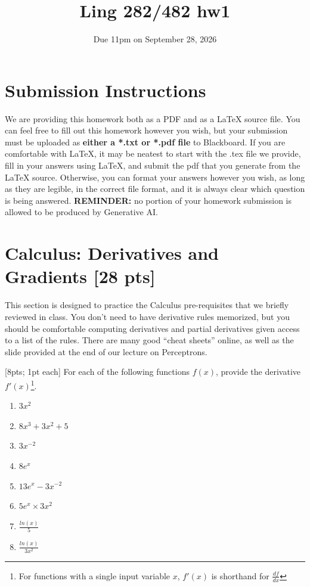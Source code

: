 \documentclass[11pt]{article}
\begin{document}
\title{Ling 282/482 hw1}
\date{\vspace{-0.2in}Due 11pm on September 28, 2026}
\maketitle

\section*{Submission Instructions}
We are providing this homework both as a PDF and as a LaTeX source file. You can feel free to fill out this homework however you wish, but your submission must be uploaded as \textbf{either a *.txt or *.pdf file} to Blackboard. If you are comfortable with LaTeX, it may be neatest to start with the .tex file we provide, fill in your answers using LaTeX, and submit the pdf that you generate from the LaTeX source. Otherwise, you can format your answers however you wish, as long as they are legible, in the correct file format, and it is always clear which question is being answered. \textbf{REMINDER:} no portion of your homework submission is allowed to be produced by Generative AI.

\section{Calculus: Derivatives and Gradients [28 pts]}

This section is designed to practice the Calculus pre-requisites that we briefly reviewed in class. You don't need to have derivative rules memorized, but you should be comfortable computing derivatives and partial derivatives given access to a list of the rules. There are many good ``cheat sheets'' online, as well as the slide provided at the end of our lecture on Perceptrons.

\vspace{2em}
 [8pts; 1pt each] For each of the following functions $f(x)$, provide the derivative $f'(x)$\footnote{For functions with a single input variable $x$, $f'(x)$ is shorthand for $\frac{df}{dx}$}.

\begin{enumerate}[label=\alph*.]
    \setlength\itemsep{1em}
    \item $3x^2$
    \item $8x^3 + 3x^2 + 5$
    \item $3x^{-2}$
    \item $8e^x$
    \item $13e^x - 3x^{-2}$
    \item $5e^x \times 3x^2$
    \item $\frac{ln(x)}{5}$
    \item $\frac{ln(x)}{3x^2}$
\end{enumerate}
\end{document}
